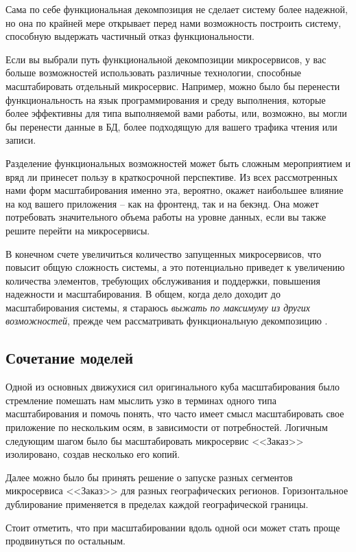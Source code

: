 \documentclass[%
	11pt,
	a4paper,
	utf8,
		]{article}
\begin{document}
Сама по себе функциональная декомпозиция не сделает систему более надежной, но она по крайней мере открывает перед нами возможность построить систему, способную выдержать частичный отказ функциональности.

Если вы выбрали путь функциональной декомпозиции микросервисов, у вас больше возможностей использовать различные технологии, способные масштабировать отдельный микросервис. Например, можно было бы перенести функциональность на язык программирования и среду выполнения, которые более эффективны для типа выполняемой вами работы, или, возможно, вы могли бы перенести данные в БД, более подходящую для вашего трафика чтения или записи.

Разделение функциональных возможностей может быть сложным мероприятием и вряд ли принесет пользу в краткосрочной перспективе. Из всех рассмотренных нами форм масштабирования именно эта, вероятно, окажет наибольшее влияние на код вашего приложения -- как на фронтенд, так и на бекэнд. Она может потребовать значительного объема работы на уровне данных, если вы также решите перейти на микросервисы.

В конечном счете увеличиться количество запущенных микросервисов, что повысит общую сложность системы, а это потенциально приведет к увеличению количества элементов, требующих обслуживания и поддержки, повышения надежности и масштабирования. {\color{red}В общем, когда дело доходит до масштабирования системы, я стараюсь \emph{выжать по максимуму из других возможностей}, прежде чем рассматривать функциональную декомпозицию} \cite[]{microservices-2024}.

\subsection{Сочетание моделей}

Одной из основных движухися сил оригинального куба масштабирования было стремление помешать нам мыслить узко в терминах одного типа масштабирования и помочь понять, что часто имеет смысл масштабировать свое приложение по нескольким осям, в зависимости от потребностей. Логичным следующим шагом было бы масштабировать микросервис <<Заказ>> изолировано, создав несколько его копий.

Далее можно было бы принять решение о запуске разных сегментов микросервиса <<Заказ>> для разных географических регионов. Горизонтальное дублирование применяется в пределах каждой географической границы.

Стоит отметить, что при масштабировании вдоль одной оси может стать проще продвинуться по остальным.
\end{document}
